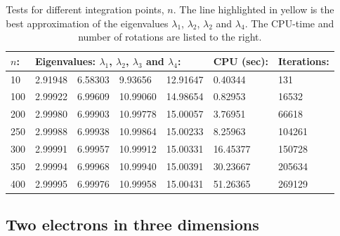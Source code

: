\documentclass{article}
\begin{document}
\begin{table}[h]
\begin{tabular}{lllllll}
\centering
\hline
\textbf{$n$:} & \multicolumn{4}{l}{\textbf{Eigenvalues: $\lambda_1$, $\lambda_2$, $\lambda_3$ and $\lambda_4$:}} & \textbf{CPU (sec):} & \textbf{Iterations:} \\ \hline
10                                & 2.91948                  & 6.58303                  & 9.93656                   & 12.91647                  & 0.40344                  & 131                  \\
100                               & 2.99922                  & 6.99609                  & 10.99060                  & 14.98654                  & 0.82953                  & 16532                \\
200                               & 2.99980                  & 6.99903                  & 10.99778                  & 15.00057                  & 3.76951                  & 66618                \\ \rowcolor{yellow}
250                               & 2.99988                  & 6.99938                  & 10.99864                  & 15.00233                  & 8.25963                  & 104261               \\
300                               & 2.99991                  & 6.99957                  & 10.99912                  & 15.00331                  & 16.45377                 & 150728               \\
350                               & 2.99994                  & 6.99968                  & 10.99940                  & 15.00391                  & 30.23667                 & 205634               \\
400                               & 2.99995                  & 6.99976                  & 10.99958                  & 15.00431                  & 51.26365                 & 269129               \\ \hline
\end{tabular}
\caption{Tests for different integration points, $n$. The line highlighted in yellow is the best approximation of the eigenvalues $\lambda_1$, $\lambda_2$, $\lambda_2$ and $\lambda_4$. The CPU-time and number of rotations are listed to the right.}
\label{fig:txt}
\end{table}


\subsection{Two electrons in three dimensions}
\end{document}
